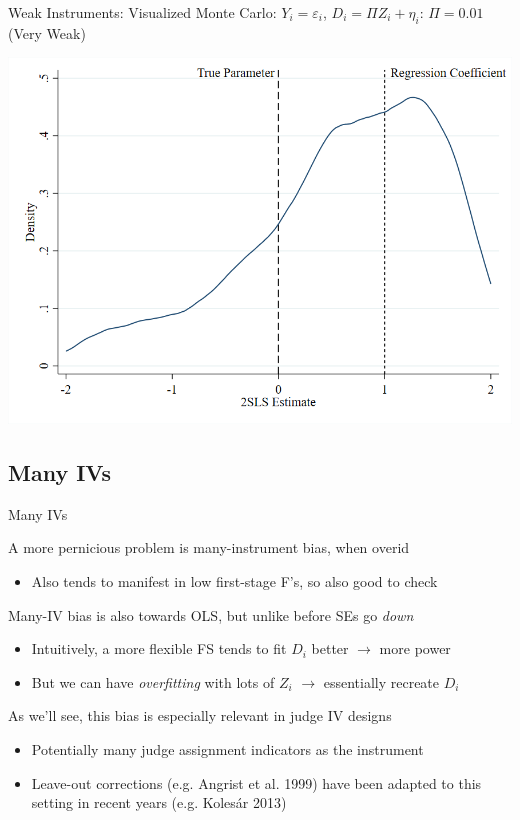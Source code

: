 \documentclass{beamer}
\begin{document}
\begin{frame}{Weak Instruments: Visualized}
Monte Carlo: $Y_i=\varepsilon_i$, $D_i=\Pi Z_i+\eta_i$: $\Pi=0.01$ (Very Weak)
\begin{center}
\includegraphics[scale=0.35]{./lecture_includes/weakpi.png}
\end{center}

\end{frame}


\subsection{Many IVs}
\begin{frame}{Many IVs}

A more pernicious problem is many-instrument bias, when overid\smallskip
\begin{itemize}
  \item Also tends to manifest in low first-stage F's, so also good to check
\end{itemize}\bigskip\pause{}

Many-IV bias is also towards OLS, but unlike before SEs go \emph{down}\smallskip
\begin{itemize}
  \item Intuitively, a more flexible FS tends to fit $D_i$ better $\rightarrow$ more power\smallskip
  \item But we can have \emph{overfitting} with lots of $Z_i$ $\rightarrow$ essentially recreate $D_i$
\end{itemize}\bigskip\pause{}

As we'll see, this bias is especially relevant in judge IV designs\smallskip
\begin{itemize}
  \item Potentially many judge assignment indicators as the instrument\smallskip
  \item Leave-out corrections (e.g. Angrist et al. 1999) have been adapted to this setting in recent years (e.g. Koles\'{a}r 2013)
\end{itemize}

\end{frame}
\end{document}
